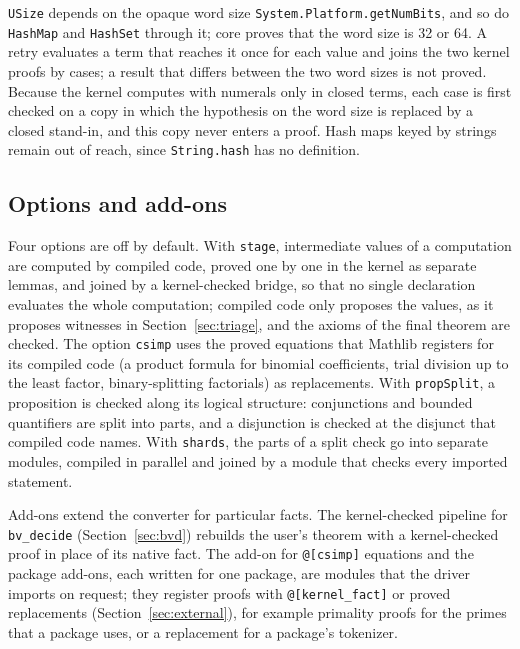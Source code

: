 \documentclass[11pt]{article}
\begin{document}
\texttt{USize} depends on the opaque word size \texttt{System.Platform.\allowbreak getNumBits}, and so do
\texttt{HashMap} and \texttt{HashSet} through it; core proves that the word size is 32 or 64. A retry evaluates a term that
reaches it once for each value and joins the two kernel proofs by cases; a result that differs between the
two word sizes is not proved. Because the kernel computes with numerals only in closed terms, each case is
first checked on a copy in which the hypothesis on the word size is replaced by a closed stand-in, and this
copy never enters a proof. Hash maps keyed by strings remain out of reach, since \texttt{String.hash} has no
definition.

\subsection{Options and add-ons}\label{sec:options}
Four options are off by default. With \texttt{stage}, intermediate values of a computation are computed by
compiled code, proved one by one in the kernel as separate lemmas, and joined by a kernel-checked bridge, so
that no single declaration evaluates the whole computation; compiled code only proposes the values, as it
proposes witnesses in Section~\ref{sec:triage}, and the axioms of the final theorem are checked. The option \texttt{csimp} uses the proved equations that Mathlib
registers for its compiled code (a product formula for binomial coefficients, trial division up to the least
factor, binary-splitting factorials) as replacements. With \texttt{propSplit}, a proposition is checked along
its logical structure: conjunctions and bounded quantifiers are split into parts, and a disjunction is checked
at the disjunct that compiled code names. With \texttt{shards}, the parts of a split check go into separate
modules, compiled in parallel and joined by a module that checks every imported statement.

Add-ons extend the converter for particular facts. The kernel-checked pipeline for \texttt{bv\_decide}
(Section~\ref{sec:bvd}) rebuilds the user's theorem with a kernel-checked proof in place of its native fact.
The add-on for \verb|@[csimp]| equations and the package add-ons, each written for one package, are modules
that the driver imports on request; they register proofs with \verb|@[kernel_fact]| or proved replacements
(Section~\ref{sec:external}), for example primality proofs for the primes that a
package uses, or a replacement for a package's tokenizer.
\end{document}
